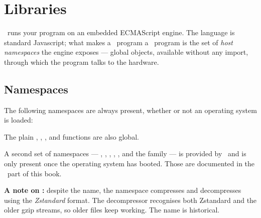 \chapter{Libraries}

\thismachine\ runs your program on an embedded ECMAScript engine. The language is standard Javascript; what makes a \thismachine\ program a \thismachine\ program is the set of \emph{host namespaces} the engine exposes --- global objects, available without any import, through which the program talks to the hardware.

\section{Namespaces}

The following namespaces are always present, whether or not an operating system is loaded:

\begin{outline}
\1
\1
\1
\1
\1
\1
\1
\1
\1
\end{outline}

The plain , , ,  and  functions are also global.

A second set of namespaces --- , , , , ,  and the  family --- is provided by \thedos\ and is only present once the operating system has booted. Those are documented in the \thedos\ part of this book.

\textbf{A note on :} despite the name, the  namespace compresses and decompresses using the \emph{Zstandard} format. The decompressor recognises both Zstandard and the older gzip streams, so older files keep working. The name is historical.

